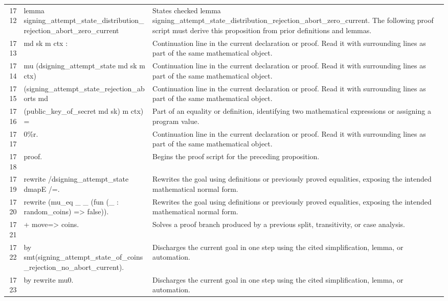 \documentclass[10pt]{article}
\begin{document}
\begin{longtable}{r L{0.53\textwidth} L{0.37\textwidth}}
1712 & {\ttfamily\scriptsize lemma signing\_attempt\_state\_distribution\_rejection\_abort\_zero\_current} & States checked lemma signing\_attempt\_state\_distribution\_rejection\_abort\_zero\_current.  The following proof script must derive this proposition from prior definitions and lemmas. \\
1713 & {\ttfamily\scriptsize   md sk m ctx :} & Continuation line in the current declaration or proof.  Read it with surrounding lines as part of the same mathematical object. \\
1714 & {\ttfamily\scriptsize   mu (dsigning\_attempt\_state md sk m ctx)} & Continuation line in the current declaration or proof.  Read it with surrounding lines as part of the same mathematical object. \\
1715 & {\ttfamily\scriptsize     (signing\_attempt\_state\_rejection\_aborts md} & Continuation line in the current declaration or proof.  Read it with surrounding lines as part of the same mathematical object. \\
1716 & {\ttfamily\scriptsize        (public\_key\_of\_secret md sk) m ctx) =} & Part of an equality or definition, identifying two mathematical expressions or assigning a program value. \\
1717 & {\ttfamily\scriptsize   0\%r.} & Continuation line in the current declaration or proof.  Read it with surrounding lines as part of the same mathematical object. \\
1718 & {\ttfamily\scriptsize proof.} & Begins the proof script for the preceding proposition. \\
1719 & {\ttfamily\scriptsize rewrite /dsigning\_attempt\_state dmapE /=.} & Rewrites the goal using definitions or previously proved equalities, exposing the intended mathematical normal form. \\
1720 & {\ttfamily\scriptsize rewrite (mu\_eq \_ \_ (fun (\_ : random\_coins) => false)).} & Rewrites the goal using definitions or previously proved equalities, exposing the intended mathematical normal form. \\
1721 & {\ttfamily\scriptsize + move=> coins.} & Solves a proof branch produced by a previous split, transitivity, or case analysis. \\
1722 & {\ttfamily\scriptsize   by smt(signing\_attempt\_state\_of\_coins\_rejection\_no\_abort\_current).} & Discharges the current goal in one step using the cited simplification, lemma, or automation. \\
1723 & {\ttfamily\scriptsize by rewrite mu0.} & Discharges the current goal in one step using the cited simplification, lemma, or automation. \\

\end{longtable}
\end{document}
